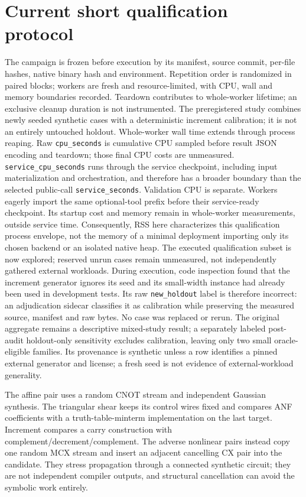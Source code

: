 \documentclass[10pt,a4paper]{article}
\begin{document}
\section{Current short qualification protocol}\label{sec:method}
The campaign is frozen before execution by its manifest, source commit, per-file hashes,
native binary hash and environment. Repetition order is randomized in paired blocks;
workers are fresh and resource-limited, with CPU, wall and memory boundaries recorded.
Teardown contributes to whole-worker lifetime; an exclusive cleanup duration is not
instrumented. The preregistered study combines newly seeded synthetic cases with a
deterministic increment calibration; it is not an entirely untouched holdout.
Whole-worker wall time extends through process reaping. Raw \texttt{cpu\_seconds}
is cumulative CPU sampled before result JSON encoding and teardown; those final CPU
costs are unmeasured. \texttt{service\_cpu\_seconds} runs through the service checkpoint,
including input materialization and orchestration, and therefore has a broader boundary
than the selected public-call \texttt{service\_seconds}. Validation CPU is separate.
Workers eagerly import the same optional-tool prefix before their service-ready checkpoint.
Its startup cost and memory remain in whole-worker measurements, outside service time.
Consequently, RSS here characterizes this qualification process envelope, not the memory
of a minimal deployment importing only its chosen backend or an isolated native heap.
The executed qualification subset is now explored; reserved unrun cases remain unmeasured,
not independently gathered external workloads. During execution, code inspection found that
the increment generator ignores its seed and its small-width instance had already been
used in development tests. Its raw \texttt{new\_holdout} label is therefore incorrect:
an adjudication sidecar classifies it as calibration while preserving the measured source,
manifest and raw bytes. No case was replaced or rerun. The original aggregate remains a
descriptive mixed-study result; a separately labeled post-audit holdout-only sensitivity
excludes calibration, leaving only two small oracle-eligible families. Its provenance
is synthetic unless a row identifies a pinned external generator and license; a fresh seed
is not evidence of external-workload generality.

The affine pair uses a random CNOT stream and independent Gaussian synthesis.
The triangular shear keeps its control wires fixed and compares ANF coefficients with
a truth-table-minterm implementation on the last target. Increment compares a carry
construction with complement/decrement/complement. The adverse nonlinear pairs instead
copy one random MCX stream and insert an adjacent cancelling CX pair into the candidate.
They stress propagation through a connected synthetic circuit; they are not independent
compiler outputs, and structural cancellation can avoid the symbolic work entirely.
\end{document}
